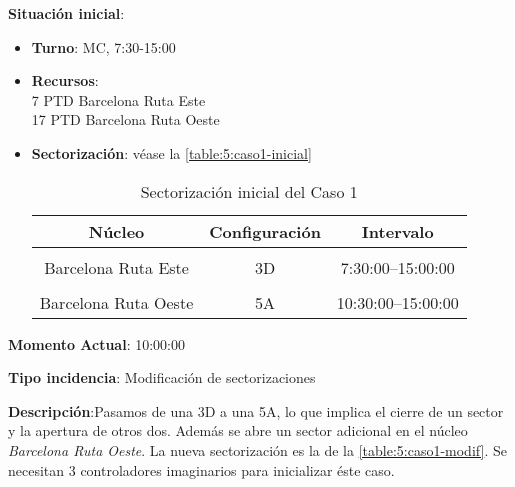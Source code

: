 \textbf{Situación inicial}:
\begin{itemize}[label={}]
	
	\item \textbf{Turno}: MC, 7:30-15:00
	
	\item \textbf{Recursos}: \\
	7 PTD Barcelona Ruta Este \\
	17 PTD Barcelona Ruta Oeste
	
	
	\item \textbf{Sectorización}: véase la \autoref{table:5:caso1-inicial}
	\begin{table}[h]
		\centering
		\caption{Sectorización inicial del Caso 1}
		\begin{tabular}{ccc}
			\hline
			\textbf{Núcleo}      & \textbf{Configuración} & \textbf{Intervalo}   \\ \hline
			\multicolumn{1}{l}{} & \multicolumn{1}{l}{}   & \multicolumn{1}{l}{} \\
			Barcelona Ruta Este  & 3D                     & 7:30:00--15:00:00    \\
			\multicolumn{1}{l}{} & \multicolumn{1}{l}{}   & \multicolumn{1}{l}{} \\
			Barcelona Ruta Oeste & 5A                     & 10:30:00--15:00:00   \\ \hline
		\end{tabular}
		\label{table:5:caso1-inicial}
	\end{table}
	
	
\end{itemize}

\textbf{Momento Actual}: 10:00:00

\textbf{Tipo incidencia}: Modificación de sectorizaciones

\textbf{Descripción}:Pasamos de una 3D a una 5A, lo que implica el cierre de un sector y la apertura de otros dos. Además se abre un sector adicional en el núcleo \textit{Barcelona Ruta Oeste}. La nueva sectorización es la de la \autoref{table:5:caso1-modif}. Se necesitan 3 controladores imaginarios para inicializar éste caso.

